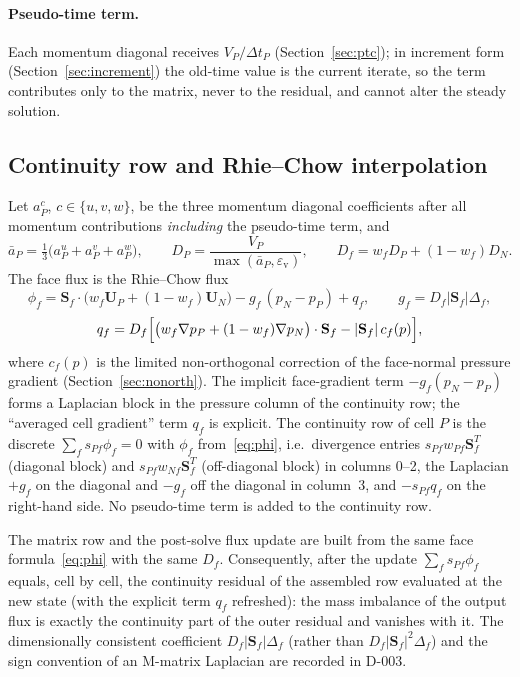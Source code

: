 \documentclass[11pt,a4paper]{article}
\newcommand{\vect}[1]{\mathbf{#1}}
\newcommand{\Uv}{\vect{U}}
\newcommand{\Sf}{\vect{S}_f}
\newcommand{\dt}{\Delta t}
\newcommand{\VSMALL}{\varepsilon_{\mathrm{v}}}
\begin{document}
\paragraph{Pseudo-time term.}
Each momentum diagonal receives $V_P/\dt_P$ (Section~\ref{sec:ptc}); in
increment form (Section~\ref{sec:increment}) the old-time value is the
current iterate, so the term contributes only to the matrix, never to the
residual, and cannot alter the steady solution.

\subsection{Continuity row and Rhie--Chow interpolation}\label{sec:rc}

Let $a^{c}_P$, $c\in\{u,v,w\}$, be the three momentum diagonal coefficients
after all momentum contributions \emph{including} the pseudo-time term, and
\begin{equation}
  \bar a_P = \tfrac13\bigl(a^u_P+a^v_P+a^w_P\bigr),\qquad
  D_P = \frac{V_P}{\max(\bar a_P,\VSMALL)},\qquad
  D_f = w_fD_P+(1-w_f)D_N .
\end{equation}
The face flux is the Rhie--Chow flux~\cite{RhieChow1983}
\begin{equation}
  \phi_f = \Sf\cdot\bigl(w_f\Uv_P+(1-w_f)\Uv_N\bigr)
  - g_f\,(p_N-p_P) + q_f,
  \qquad g_f = D_f|\Sf|\Delta_f,
  \label{eq:phi}
\end{equation}
\begin{equation}
  q_f = D_f\Bigl[\bigl(w_f\nabla p_P+(1-w_f)\nabla p_N\bigr)\cdot\Sf
      - |\Sf|\,c_f(p)\Bigr],
  \label{eq:q}
\end{equation}
where $c_f(p)$ is the limited non-orthogonal correction of the face-normal
pressure gradient (Section~\ref{sec:nonorth}). The implicit face-gradient
term $-g_f(p_N-p_P)$ forms a Laplacian block in the pressure column of the
continuity row; the ``averaged cell gradient'' term $q_f$ is explicit. The
continuity row of cell $P$ is the discrete $\sum_f s_{Pf}\phi_f=0$ with
$\phi_f$ from~\eqref{eq:phi}, i.e.\ divergence entries
$s_{Pf}w_{Pf}\Sf^T$ (diagonal block) and $s_{Pf}w_{Nf}\Sf^T$ (off-diagonal
block) in columns 0--2, the Laplacian $+g_f$ on the diagonal and $-g_f$ off
the diagonal in column~3, and $-s_{Pf}q_f$ on the right-hand side. No
pseudo-time term is added to the continuity row.

The matrix row and the post-solve flux update are built from the same face
formula~\eqref{eq:phi} with the same $D_f$. Consequently, after the update
$\sum_f s_{Pf}\phi_f$ equals, cell by cell, the continuity residual of the
assembled row evaluated at the new state (with the explicit term $q_f$
refreshed): the mass imbalance of the output flux is exactly the continuity
part of the outer residual and vanishes with it. The dimensionally consistent
coefficient $D_f|\Sf|\Delta_f$ (rather than $D_f|\Sf|^2\Delta_f$) and the
sign convention of an M-matrix Laplacian are recorded in D-003.
\end{document}
